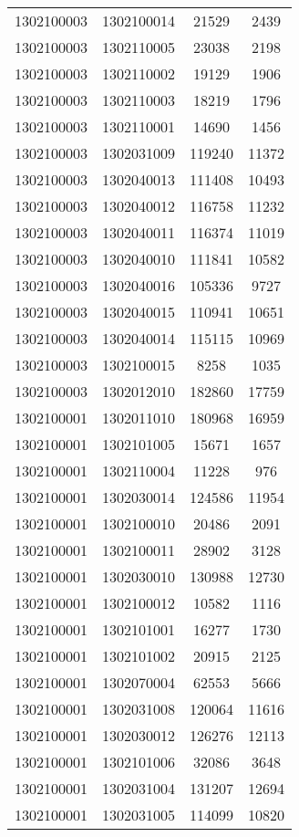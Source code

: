 \begin{longtable}[h]{llcc}
		1302100003 & 1302100014 & 21529 & 2439\\
		1302100003 & 1302110005 & 23038 & 2198\\
		1302100003 & 1302110002 & 19129 & 1906\\
		1302100003 & 1302110003 & 18219 & 1796\\
		1302100003 & 1302110001 & 14690 & 1456\\
		1302100003 & 1302031009 & 119240 & 11372\\
		1302100003 & 1302040013 & 111408 & 10493\\
		1302100003 & 1302040012 & 116758 & 11232\\
		1302100003 & 1302040011 & 116374 & 11019\\
		1302100003 & 1302040010 & 111841 & 10582\\
		1302100003 & 1302040016 & 105336 & 9727\\
		1302100003 & 1302040015 & 110941 & 10651\\
		1302100003 & 1302040014 & 115115 & 10969\\
		1302100003 & 1302100015 & 8258 & 1035\\
		1302100003 & 1302012010 & 182860 & 17759\\
		1302100001 & 1302011010 & 180968 & 16959\\
		1302100001 & 1302101005 & 15671 & 1657\\
		1302100001 & 1302110004 & 11228 & 976\\
		1302100001 & 1302030014 & 124586 & 11954\\
		1302100001 & 1302100010 & 20486 & 2091\\
		1302100001 & 1302100011 & 28902 & 3128\\
		1302100001 & 1302030010 & 130988 & 12730\\
		1302100001 & 1302100012 & 10582 & 1116\\
		1302100001 & 1302101001 & 16277 & 1730\\
		1302100001 & 1302101002 & 20915 & 2125\\
		1302100001 & 1302070004 & 62553 & 5666\\
		1302100001 & 1302031008 & 120064 & 11616\\
		1302100001 & 1302030012 & 126276 & 12113\\
		1302100001 & 1302101006 & 32086 & 3648\\
		1302100001 & 1302031004 & 131207 & 12694\\
		1302100001 & 1302031005 & 114099 & 10820\\

\end{longtable}

